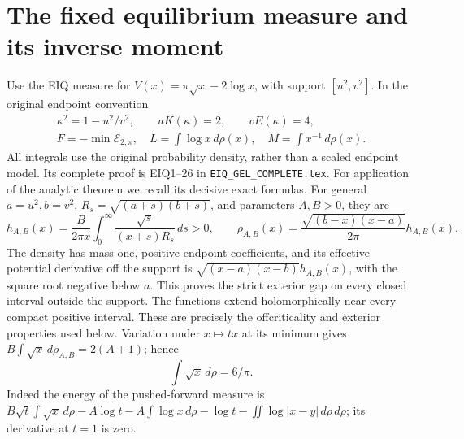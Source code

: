 \documentclass[11pt,a4paper]{article}
\providecommand{\dd}{\,d}
\begin{document}
\section{The fixed equilibrium measure and its inverse moment}
Use the EIQ measure for $V(x)=\pi\sqrt x-2\log x$, with support
$[u^2,v^2]$. In the original endpoint convention
\begin{equation}\tag{AG5}
\begin{gathered}
 \kappa^2=1-u^2/v^2,\qquad uK(\kappa)=2,\qquad vE(\kappa)=4,\\
 F=-\min\mathcal E_{2,\pi},\quad
 L=\int\log x\dd\rho(x),\quad M=\int x^{-1}\dd\rho(x).
\end{gathered}
\end{equation}
All integrals use the original probability density, rather than a scaled
endpoint model. Its complete proof is EIQ1--26 in
\texttt{EIQ\_GEL\_COMPLETE.tex}. For application of the analytic theorem
we recall its decisive exact formulas. For general $a=u^2,b=v^2$,
$R_s=\sqrt{(a+s)(b+s)}$, and parameters $A,B>0$, they are
\begin{equation}\tag{AG6}
 h_{A,B}(x)=\frac{B}{2\pi x}\int_0^\infty
 \frac{\sqrt s}{(x+s)R_s}\dd s>0,\qquad
 \rho_{A,B}(x)=\frac{\sqrt{(b-x)(x-a)}}{2\pi}h_{A,B}(x).
\end{equation}
The density has mass one, positive endpoint coefficients, and its effective
potential derivative off the support is
$\sqrt{(x-a)(x-b)}h_{A,B}(x)$, with the square root negative below $a$.
This proves the strict exterior gap on every closed interval outside the
support. The functions extend holomorphically near every compact positive
interval. These are precisely the offcriticality and exterior properties
used below. Variation under $x\mapsto tx$ at its minimum gives
$B\int\sqrt x\dd\rho_{A,B}=2(A+1)$; hence
\begin{equation}\tag{AG7}
 \int\sqrt x\dd\rho=6/\pi.
\end{equation}
Indeed the energy of the pushed-forward measure is
$B\sqrt t\int\sqrt x\dd\rho-A\log t-A\int\log x\dd\rho
-\log t-\iint\log|x-y|\dd\rho\dd\rho$; its derivative at $t=1$ is zero.
\end{document}
